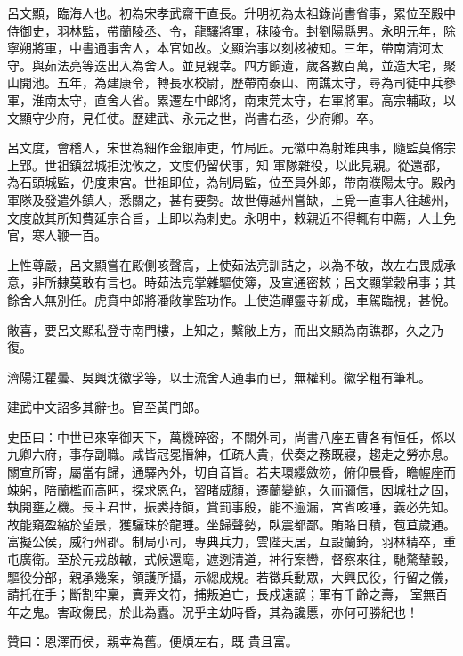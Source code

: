 \begin{pinyinscope}
 呂文顯，臨海人也。初為宋孝武齋干直長。升明初為太祖錄尚書省事，累位至殿中侍御史，羽林監，帶蘭陵丞、令，龍驤將軍，秣陵令。封劉陽縣男。永明元年，除寧朔將軍，中書通事舍人，本官如故。文顯治事以刻核被知。三年，帶南清河太守。與茹法亮等迭出入為舍人。並見親幸。四方餉遺，歲各數百萬，並造大宅，聚山開池。五年，為建康令，轉長水校尉，歷帶南泰山、南譙太守，尋為司徒中兵參軍，淮南太守，直舍人省。累遷左中郎將，南東莞太守，右軍將軍。高宗輔政，以文顯守少府，見任使。歷建武、永元之世，尚書右丞，少府卿。卒。



 呂文度，會稽人，宋世為細作金銀庫吏，竹局匠。元徽中為射雉典事，隨監莫脩宗上郢。世祖鎮盆城拒沈攸之，文度仍留伏事，知
 軍隊雜役，以此見親。從還都，為石頭城監，仍度東宮。世祖即位，為制局監，位至員外郎，帶南濮陽太守。殿內軍隊及發遣外鎮人，悉關之，甚有要勢。故世傳越州嘗缺，上覓一直事人往越州，文度啟其所知費延宗合旨，上即以為刺史。永明中，敕親近不得輒有申薦，人士免官，寒人鞭一百。



 上性尊嚴，呂文顯嘗在殿側咳聲高，上使茹法亮訓詰之，以為不敬，故左右畏威承意，非所隸莫敢有言也。時茹法亮掌雜驅使簿，及宣通密敕；呂文顯掌穀帛事；其餘舍人無別任。虎賁中郎將潘敞掌監功作。上使造禪靈寺新成，車駕臨視，甚悅。



 敞喜，要呂文顯私登寺南門樓，上知之，繫敞上方，而出文顯為南譙郡，久之乃復。



 濟陽江瞿曇、吳興沈徽孚等，以士流舍人通事而已，無權利。徽孚粗有筆札。



 建武中文詔多其辭也。官至黃門郎。



 史臣曰：中世已來宰御天下，萬機碎密，不關外司，尚書八座五曹各有恒任，係以九卿六府，事存副職。咸皆冠冕搢紳，任疏人貴，伏奏之務既寢，趨走之勞亦息。關宣所寄，屬當有歸，通驛內外，切自音旨。若夫環纓斂笏，俯仰晨昏，瞻幄座而竦躬，陪蘭檻而高眄，探求恩色，習睹威顏，遷蘭變鮑，久而彌信，因城社之固，執開壅之機。長主君世，振裘持領，賞罰事殷，能不逾漏，宮省咳唾，義必先知。故能窺盈縮於望景，獲驪珠於龍睡。坐歸聲勢，臥震都鄙。賄賂日積，苞苴歲通。富擬公侯，威行州郡。制局小司，專典兵力，雲陛天居，互設蘭錡，羽林精卒，重屯廣衛。至於元戎啟轍，式候還麾，遮迾清道，神行案轡，督察來往，馳騖輦轂，驅役分部，親承幾案，領護所攝，示總成規。若徵兵動眾，大興民役，行留之儀，請托在手；斷割牢稟，賣弄文符，捕叛追亡，長戍遠謫；軍有千齡之壽，
 室無百年之鬼。害政傷民，於此為蠹。況乎主幼時昏，其為讒慝，亦何可勝紀也！



 贊曰：恩澤而侯，親幸為舊。便煩左右，既
 貴且富。



\end{pinyinscope}